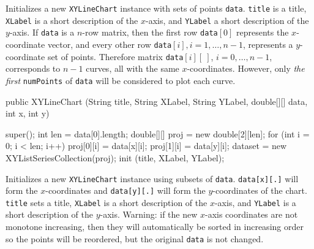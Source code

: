 \begin{tabb}
Initializes a new \texttt{XYLineChart} instance with sets of points \texttt{data}.
\texttt{title} is a title, \texttt{XLabel} is a short description of the
$x$-axis, and \texttt{YLabel} a short description of the $y$-axis.
 If \texttt{data} is a $n$-row matrix,
 then the first row \texttt{data}$[0]$ represents the
 $x$-coordinate vector, and every other row \texttt{data}$[i],
   i=1,\ldots, n-1$, represents a $y$-coordinate set of points.
  Therefore matrix \texttt{data}$[i][\ ]$, $i=0,\ldots, n-1$,  corresponds
   to $n-1$ curves, all with the same $x$-coordinates.
  However, only \emph{the first} \texttt{numPoints} of \texttt{data} will
  be considered to plot each curve.
\end{tabb}
\begin{htmlonly}
\end{htmlonly}
\begin{code}

   public XYLineChart (String title, String XLabel, String YLabel,
                       double[][] data, int x, int y) \begin{hide} {
      super();
      int len = data[0].length;
      double[][] proj = new double[2][len];
      for (int i = 0; i < len; i++) {
         proj[0][i] = data[x][i];
         proj[1][i] = data[y][i];
      }
      dataset = new XYListSeriesCollection(proj);
      init (title, XLabel, YLabel);
   }\end{hide}
\end{code}
\begin{tabb}
Initializes a new \texttt{XYLineChart} instance using subsets of \texttt{data}.
\texttt{data[x][.]} will form the $x$-coordinates and
\texttt{data[y][.]} will form the $y$-coordinates of the chart.
\texttt{title} sets a title, \texttt{XLabel} is a short description of the
$x$-axis, and \texttt{YLabel} is a short description of the $y$-axis.
Warning: if the new $x$-axis coordinates are not monotone increasing, then
they will automatically be sorted in increasing order so the points will
be reordered, but the original \texttt{data} is not changed.
\end{tabb}
\begin{htmlonly}
\end{htmlonly}
